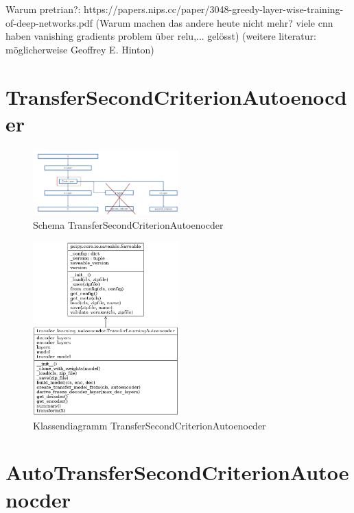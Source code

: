 		Warum pretrian?:	https://papers.nips.cc/paper/3048-greedy-layer-wise-training-of-deep-networks.pdf (Warum machen das andere heute nicht mehr? viele cnn haben vanishing gradients problem  über relu,... gelösst) (weitere literatur: möglicherweise Geoffrey E. Hinton)

	\section{TransferSecondCriterionAutoenocder}
	\label{sec:TransferSecondCriterionAutoenocder}

	\begin{figure}[h]
		\centering
		\includegraphics[width=0.5\textwidth, center]{bilder/Schema_Autoencoders/Schema_TSCAE.png}
		\caption[Schema TransferSecondCriterionAutoenocder]{Schema TransferSecondCriterionAutoenocder}
		\label{img:SchemaTSCAE}
	\end{figure}  

	
	\begin{figure}[h]
		\centering
		\includegraphics[width=0.5\textwidth, center]{bilder/Klassendiagramme/Klassendiagramm_TLCSCAE.png}
		\caption[Klassendiagramm TransferSecondCriterionAutoenocder]{Klassendiagramm TransferSecondCriterionAutoenocder}
		\label{img:KlassendiagrammTransferSecondCriterionAutoenocder}
	\end{figure}  
			
	\section{AutoTransferSecondCriterionAutoenocder}
	\label{sec:AutoTransferSecondCriterionAutoenocder}


